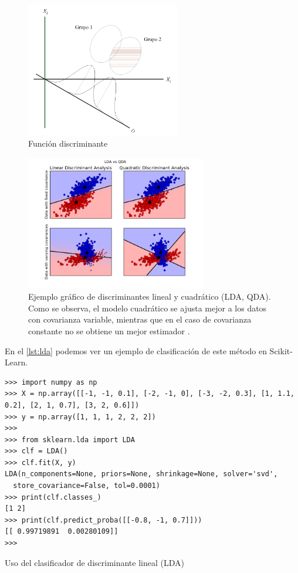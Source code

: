 \begin{figure}[htbp]
\centering
\includegraphics[width=0.6\textwidth]{lda}
\caption[Función discriminante]{Función discriminante \citep{Ruiz2001}}
\label{fig:lda}
\end{figure}

\begin{figure}[htbp]
\centering
\includegraphics[width=0.7\textwidth]{plot_lda_qda_0011}
\caption[Ejemplo gráfico de discriminantes lineal y cuadrático (LDA, QDA)]{Ejemplo gráfico de discriminantes lineal y cuadrático (LDA, QDA). Como se observa, el modelo cuadrático se ajusta mejor a los datos con covarianza variable, mientras que en el caso de covarianza constante no se obtiene un mejor estimador \citep{Pedregosa2011}.}
\label{fig:lda-qda}
\end{figure}

En el \autoref{lst:lda} podemos ver un ejemplo de clasificación de este método en Scikit-Learn.

\begin{listing}[htbp]
\begin{verbatim}
>>> import numpy as np
>>> X = np.array([[-1, -1, 0.1], [-2, -1, 0], [-3, -2, 0.3], [1, 1.1, 0.2], [2, 1, 0.7], [3, 2, 0.6]])
>>> y = np.array([1, 1, 1, 2, 2, 2])
>>> 
>>> from sklearn.lda import LDA
>>> clf = LDA()
>>> clf.fit(X, y)
LDA(n_components=None, priors=None, shrinkage=None, solver='svd',
  store_covariance=False, tol=0.0001)
>>> print(clf.classes_)
[1 2]
>>> print(clf.predict_proba([[-0.8, -1, 0.7]]))
[[ 0.99719891  0.00280109]]
>>> 
\end{verbatim}
\caption{Uso del clasificador de discriminante lineal (LDA)}
\label{lst:lda}
\end{listing}

